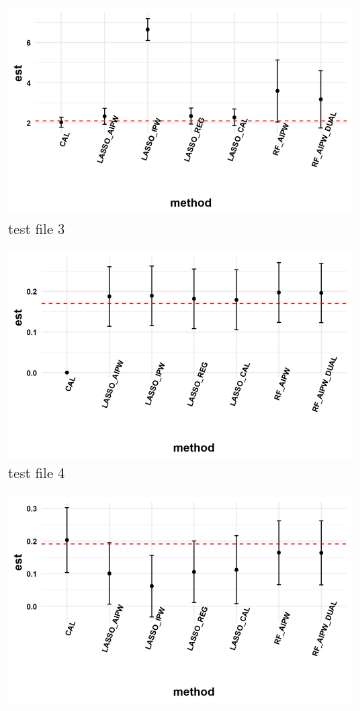 \documentclass[11pt, oneside]{article}
\begin{document}
\begin{figure}[h]
\begin{subfigure}{0.24\textwidth}
    \includegraphics[width=\textwidth]{../plot/method_comparison_3.png}
    \caption{test file 3}
  \end{subfigure}
  \begin{subfigure}{0.24\textwidth}
    \includegraphics[width=\textwidth]{../plot/method_comparison_4.png}
    \caption{test file 4}
  \end{subfigure}
  \begin{subfigure}{0.24\textwidth}
    \includegraphics[width=\textwidth]{../plot/method_comparison_5.png}

\end{subfigure}
\end{figure}
\end{document}
